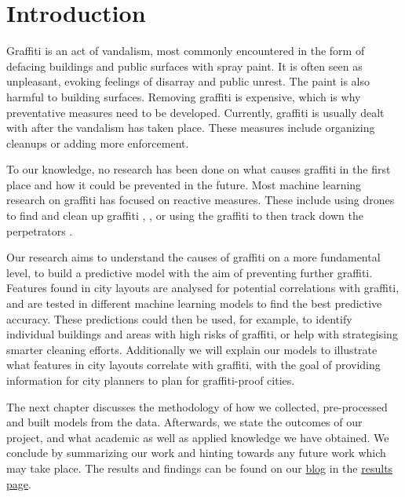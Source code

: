 \chapter{Introduction}


Graffiti is an act of vandalism, most commonly encountered in the form of defacing buildings and public surfaces with spray paint. It is often seen as unpleasant, evoking feelings of disarray and public unrest. The paint is also harmful to building surfaces. Removing graffiti is expensive, which is why preventative measures need to be developed. Currently, graffiti is usually dealt with after the vandalism has taken place. These measures include organizing cleanups or adding more enforcement.

To our knowledge, no research has been done on what causes graffiti in the first place and how it could be prevented in the future. Most machine learning research on graffiti has focused on reactive measures. These include using drones to find and clean up graffiti \cite{uav}, \cite{drone}, or using the graffiti to then track down the perpetrators \cite{gang}.

Our research aims to understand the causes of graffiti on a more fundamental level, to build a predictive model with the aim of preventing further graffiti. Features found in city layouts are analysed for potential correlations with graffiti, and are tested in different machine learning models to find the best predictive accuracy. These predictions could then be used, for example, to identify individual buildings and areas with high risks of graffiti, or help with strategising smarter cleaning efforts. Additionally we will explain our models to illustrate what features in city layouts correlate with graffiti, with the goal of providing information for city planners to plan for graffiti-proof cities.

The next chapter discusses the methodology of how we collected, pre-processed and built models from the data. Afterwards, we state the outcomes of our project, and what academic as well as applied knowledge we have obtained. We conclude by summarizing our work and hinting towards any future work which may take place. The results and findings can be found on our \href{https://cowkeyman.github.io/PredictingGraffitiUsingCityLayouts/}{blog} in the \href{https://cowkeyman.github.io/PredictingGraffitiUsingCityLayouts/results.html}{results page}.
